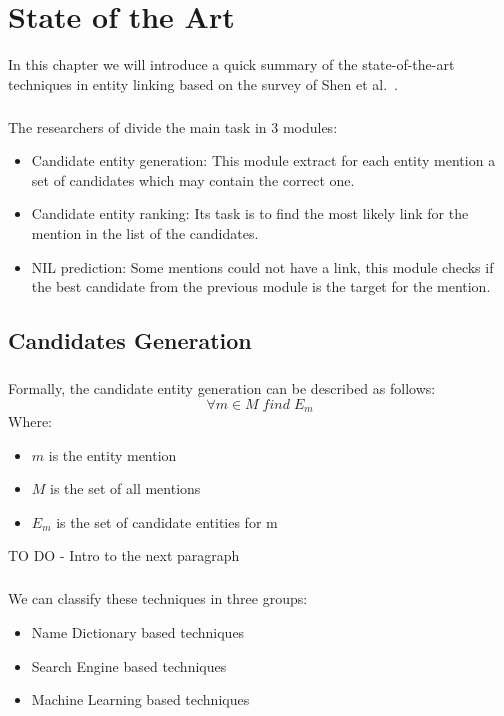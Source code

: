 \chapter{State of the Art}
In this chapter we will introduce a quick summary of the state-of-the-art techniques in entity linking based on the survey of Shen et al.~\cite{shen2015entity}.
\paragraph{}
The researchers of \cite{shen2015entity} divide the main task in 3 modules:
\begin{itemize}
\item Candidate entity generation: This module extract for each entity mention a set of candidates which may contain the correct one.
\item Candidate entity ranking: Its task is to find the most likely link for the mention in the list of the candidates.
\item NIL prediction: Some mentions could not have a link, this module checks if the best candidate from the previous module is the target for the mention. 
\end{itemize}

\section{Candidates Generation}
\paragraph{}
Formally, the candidate entity generation can be described as follows:
\[\forall m \in M \; find \; E_m\]
Where:

\begin{itemize}[noitemsep,  topsep=10pt]
\item $m$ is the entity mention
\item $M$ is the set of all mentions
\item $E_m$ is the set of candidate entities for m
\end{itemize}

TO DO - Intro to the next paragraph

\paragraph{}
We can classify these techniques in three groups:
\begin{itemize}[noitemsep,  topsep=10pt]
\item Name Dictionary based techniques
\item Search Engine based techniques
\item Machine Learning based techniques
\end{itemize}

